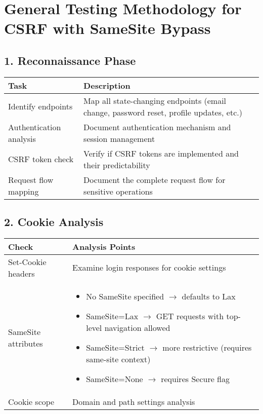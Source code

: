 \documentclass{article}
\begin{document}
\section*{General Testing Methodology for CSRF with SameSite Bypass}

\subsection*{1. Reconnaissance Phase}
\begin{tabular}{>{\raggedright\arraybackslash}p{}>{\raggedright\arraybackslash}p{}}
    \toprule
    \textbf{Task} & \textbf{Description} \\
    \midrule
    Identify endpoints & Map all state-changing endpoints (email change, password reset, profile updates, etc.) \\
    Authentication analysis & Document authentication mechanism and session management \\
    CSRF token check & Verify if CSRF tokens are implemented and their predictability \\
    Request flow mapping & Document the complete request flow for sensitive operations \\
    \bottomrule
\end{tabular}

\subsection*{2. Cookie Analysis}
\begin{tabular}{>{\raggedright\arraybackslash}p{}>{\raggedright\arraybackslash}p{}}
    \toprule
    \textbf{Check} & \textbf{Analysis Points} \\
    \midrule
    Set-Cookie headers & Examine login responses for cookie settings \\
    SameSite attributes & 
    \begin{itemize}
        \setlength\itemsep{0em}
        \item No SameSite specified $\rightarrow$ defaults to Lax
        \item SameSite=Lax $\rightarrow$ GET requests with top-level navigation allowed
        \item SameSite=Strict $\rightarrow$ more restrictive (requires same-site context)
        \item SameSite=None $\rightarrow$ requires Secure flag
    \end{itemize} \\
    Cookie scope & Domain and path settings analysis \\
    \bottomrule
\end{tabular}
\end{document}
